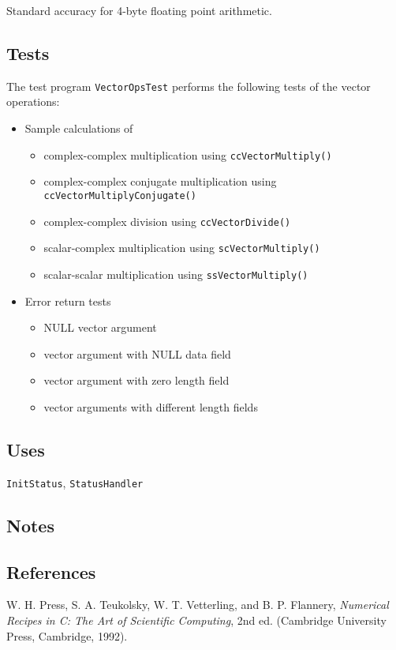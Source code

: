 \documentclass{article}
\begin{document}

Standard accuracy for 4-byte floating point arithmetic.

\subsection{Tests}


The test program \texttt{VectorOpsTest} performs the following tests of
the vector operations:
\begin{itemize}
\item Sample calculations of
\begin{itemize}
\item complex-complex multiplication using \texttt{ccVectorMultiply()}
\item complex-complex conjugate multiplication using
  \texttt{ccVectorMultiplyConjugate()}
\item complex-complex division using \texttt{ccVectorDivide()}
\item scalar-complex multiplication using \texttt{scVectorMultiply()}
\item scalar-scalar multiplication using \texttt{ssVectorMultiply()}
\end{itemize}
\item Error return tests
\begin{itemize}
\item NULL vector argument
\item vector argument with NULL data field
\item vector argument with zero length field
\item vector arguments with different length fields
\end{itemize}
\end{itemize}

\subsection{Uses}


\texttt{InitStatus}, \texttt{StatusHandler}

\subsection{Notes}

\subsection{References}

\begin{thebibliography}{0}
  W. H. Press, S. A. Teukolsky, W. T. Vetterling, and B. P. Flannery,
  \textit{Numerical Recipes in C: The Art of Scientific Computing}, 2nd ed.
  (Cambridge University Press, Cambridge, 1992).
\end{thebibliography}
\end{document}
